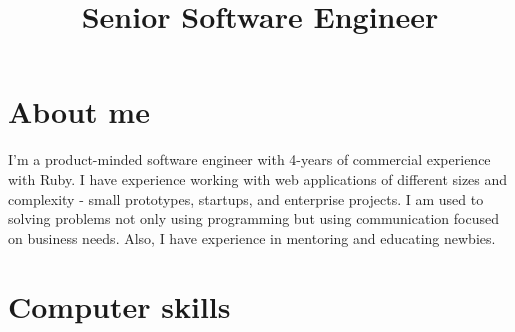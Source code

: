 \documentclass[11pt,a4paper]{moderncv}
\title{Senior Software Engineer}
\begin{document}
\maketitle

\section{About me}
I'm a product-minded software engineer with 4-years of commercial experience with Ruby. I have experience working with web applications of different sizes and complexity - small prototypes, startups, and enterprise projects. I am used to solving problems not only using programming but using communication focused on business needs. Also, I have experience in mentoring and educating newbies.

\section{Computer skills}
\begin{cvcolumns}
\end{cvcolumns}
\end{document}

